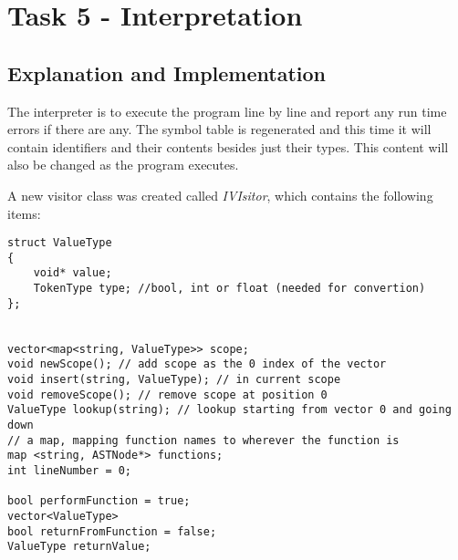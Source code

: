 \section{Task 5 - Interpretation}
\subsection{Explanation and Implementation}
The interpreter is to execute the program line by line and report any run time errors if there are any. The symbol table is regenerated and this time it will contain identifiers and their contents besides just their types. This content will also be changed as the program executes.

A new visitor class was created called \textit{IVIsitor}, which contains the following items:

\begin{lstlisting}
struct ValueType
{
	void* value;
	TokenType type; //bool, int or float (needed for convertion)
};


vector<map<string, ValueType>> scope;
void newScope(); // add scope as the 0 index of the vector
void insert(string, ValueType); // in current scope
void removeScope(); // remove scope at position 0
ValueType lookup(string); // lookup starting from vector 0 and going down
// a map, mapping function names to wherever the function is
map <string, ASTNode*> functions;
int lineNumber = 0;

bool performFunction = true;
vector<ValueType> 
bool returnFromFunction = false;
ValueType returnValue;
\end{lstlisting}


